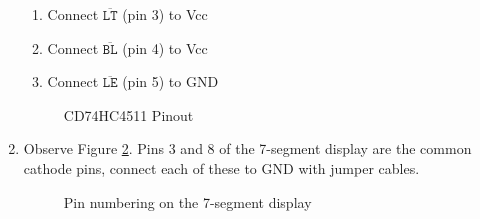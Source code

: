 \documentclass{UoNMCHA}
\numberwithin{equation}{section}
\begin{document}
\begin{enumerate}
\begin{enumerate}
        \item Connect $\overline{\texttt{LT}}$ (pin 3) to Vcc
        \item Connect $\overline{\texttt{BL}}$ (pin 4) to Vcc
        \item Connect $\overline{\texttt{LE}}$ (pin 5) to GND
    \end{enumerate}
\begin{figure}[H]
\caption{CD74HC4511 Pinout}
\label{fig:4511pinout}
\end{figure}
    \item Observe Figure \ref{fig:ssegpinout}. Pins 3 and 8 of the 7-segment display are the common cathode pins, connect each of these to GND with jumper cables.
\begin{figure}[H]
\caption{Pin numbering on the 7-segment display}
\label{fig:ssegpinout}
\end{figure}
\begin{figure}[H]

\end{figure}
\end{enumerate}
\end{document}
